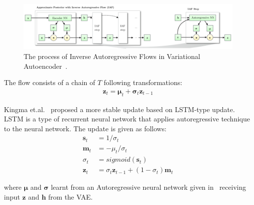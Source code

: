 \documentclass[runningheads]{llncs}
\begin{document}
\begin{figure}[htb]
	\centering
	\includegraphics[width=\textwidth]{imgs/iaf}
	\caption{The process of Inverse Autoregressive Flows in Variational Autoencoder~\cite{kingma2016improved}.}
	\label{fig:iaf}
\end{figure}

The flow consists of a chain of $T$ following transformations:
\begin{align}
\mathbf{z}_t = \bm{\mu}_t + \bm{\sigma}_t\mathbf{z}_{t-1}
\end{align}

Kingma et.al.~\cite{kingma2016improved} proposed a more stable update based on LSTM-type update. LSTM is a type of recurrent neural network that applies autoregressive technique to the neural network.  The update is given as follows:
\begin{align}
\mathbf{s}_t &= 1 / \sigma_t\\
\mathbf{m}_t &= -\mu_t / \sigma_t\\
\sigma_t &= sigmoid(\mathbf{s}_t)\\
\mathbf{z}_t &= \sigma_t\mathbf{z}_{t-1} + (1 - \sigma_t)\mathbf{m}_{t} 
\end{align}

where $\bm{\mu}$ and $\bm{\sigma}$ learnt from an Autoregressive neural network given in~\cite{germain2015made} receiving input $\mathbf{z}$ and $\mathbf{h}$ from the VAE. 
\end{document}
